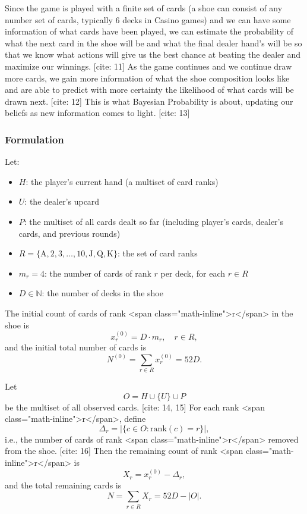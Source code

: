 \documentclass[12pt,a4paper]{cibb}
\begin{document}
Since the game is played with a finite set of cards (a shoe can consist of any number set of cards, typically 6 decks in Casino games) and we can have some information of what cards have been played, we can estimate the probability of what the next card in the shoe will be and what the final dealer hand's will be so that we know what actions will give us the best chance at beating the dealer and maximize our winnings. [cite: 11]
As the game continues and we continue draw more cards, we gain more information of what the shoe composition looks like and are able to predict with more certainty the likelihood of what cards will be drawn next. [cite: 12]
This is what Bayesian Probability is about, updating our beliefs as new information comes to light. [cite: 13]

\subsubsection{Formulation}

Let:
\begin{itemize}
  \item $H$: the player's current hand (a multiset of card ranks)
  \item $U$: the dealer's upcard
  \item $P$: the multiset of all cards dealt so far (including player's cards, dealer's cards, and previous rounds)
  \item $R = \{\mathrm{A}, 2, 3, \dots, 10, \mathrm{J}, \mathrm{Q}, \mathrm{K}\}$: the set of card ranks
  \item $m_r = 4$: the number of cards of rank $r$ per deck, for each $r \in R$
  \item $D \in \mathbb{N}$: the number of decks in the shoe
\end{itemize}

The initial count of cards of rank <span class="math-inline">r</span> in the shoe is
\[
  x_r^{(0)} = D \cdot m_r, \quad r\in R,
\]
and the initial total number of cards is
\[
  N^{(0)} = \sum_{r\in R} x_r^{(0)} = 52D.
\]

Let
\[
  O = H \cup \{U\} \cup P
\]
be the multiset of all observed cards. [cite: 14, 15]
For each rank <span class="math-inline">r</span>, define
\[
  \Delta_r = \bigl|\{c \in O : \mathrm{rank}(c)=r\}\bigr|,
\]
i.e., the number of cards of rank <span class="math-inline">r</span> removed from the shoe. [cite: 16]
Then the remaining count of rank <span class="math-inline">r</span> is
\[
  X_r = x_r^{(0)} - \Delta_r,
\]
and the total remaining cards is
\[
  N = \sum_{r\in R} X_r = 52D - |O|.
\]
\end{document}
